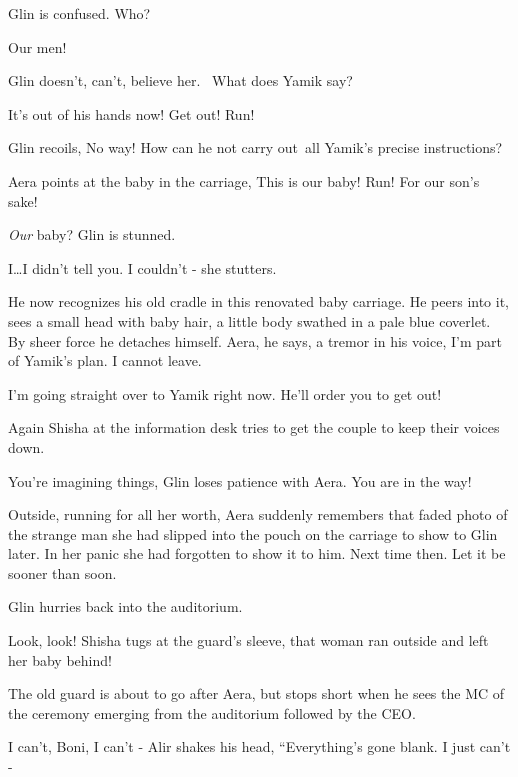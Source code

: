 \documentclass[letterpaper]{article}
\begin{document}
Glin is confused. {\textquotedbl}Who?{\textquotedbl} \ ~

{\textquotedbl}Our men!{\textquotedbl} 

Glin doesn't, can't, believe her. \ {\textquotedbl}What does Yamik say?{\textquotedbl} 

{\textquotedbl}It's out of his hands now! Get out! Run! {\textquotedbl} 

Glin recoils, {\textquotedbl}No way!{\textquotedbl} How can he not carry out~all Yamik's precise instructions? 

Aera points at the baby in the carriage, {\textquotedbl}This is our baby! Run! For our son's sake!{\textquotedbl}~ 

{\textquotedbl}\textit{Our }baby?{\textquotedbl} Glin is stunned.

{\textquotedbl}I{\dots}I didn't tell you. I couldn't - {\textquotedbl}she stutters.

He now recognizes his old cradle in this renovated baby carriage. He peers into it,{ }sees a small head
with baby hair, a little{ }body swathed in a pale blue coverlet. By sheer force
he detaches himself. {\textquotedbl}Aera,{\textquotedbl} he says, a tremor in his voice, {\textquotedbl}I'm part of
Yamik's plan. I cannot leave.{\textquotedbl} 

{\textquotedbl}I'm going straight over to Yamik right now. He'll order you to get out!{\textquotedbl} 

Again Shisha at the information desk tries to get the couple to keep their voices down.

{\textquotedbl}You're imagining things,{\textquotedbl} Glin loses patience with Aera. {\textquotedbl}You are in the
way!{\textquotedbl}

Outside, running for all her worth, Aera suddenly remembers that faded photo of the strange man she had slipped into the
pouch on the carriage to show to Glin later. In her panic she had forgotten to show it to him. Next time then. Let it
be sooner than soon.

Glin hurries back into the auditorium. 

{\textquotedbl}Look, look!{\textquotedbl} Shisha tugs at the guard's sleeve,{\textquotedbl} that woman ran outside and
left her baby behind!{\textquotedbl} 

The old guard is about to go after Aera, but stops short when he sees the MC of the ceremony emerging from the
auditorium followed by the CEO.

{\textquotedbl}I can't, Boni, I can't -{\textquotedbl} Alir shakes his head, ``Everything's gone blank. I just can't
-{\textquotedbl}~ 
\end{document}
